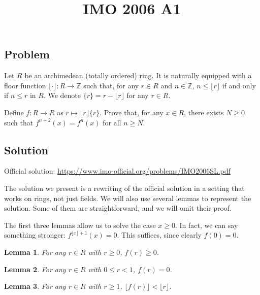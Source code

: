 \documentclass{article}
\title{IMO 2006 A1}
\author{}
\date{}
\newcommand{\Z}{\mathbb{Z}}
\newtheorem{lemma}{Lemma}
\begin{document}
\maketitle



\subsection*{Problem}

Let $R$ be an archimedean (totally ordered) ring.
It is naturally equipped with a floor function $\lfloor \cdot \rfloor : R \to \Z$ such that, for any $r \in R$ and $n \in \Z$, $n \leq \lfloor r \rfloor$ if and only if $n \leq r$ in $R$.
We denote $\{r\} = r - \lfloor r \rfloor$ for any $r \in R$.

Define $f : R \to R$ as $r \mapsto \lfloor r \rfloor \{r\}$.
Prove that, for any $x \in R$, there exists $N \geq 0$ such that $f^{n + 2}(x) = f^n(x)$ for all $n \geq N$.



\subsection*{Solution}

Official solution: \url{https://www.imo-official.org/problems/IMO2006SL.pdf}

The solution we present is a rewriting of the official solution in a setting that works on rings, not just fields.
We will also use several lemmas to represent the solution.
Some of them are straightforward, and we will omit their proof.

The first three lemmas allow us to solve the case $x \geq 0$.
In fact, we can say something stronger: $f^{\lfloor x \rfloor + 1}(x) = 0$.
This suffices, since clearly $f(0) = 0$.

\begin{lemma}\label{2006a1-1}
For any $r \in R$ with $r \geq 0$, $f(r) \geq 0$.
\end{lemma}

\begin{lemma}\label{2006a1-2}
For any $r \in R$ with $0 \leq r < 1$, $f(r) = 0$.
\end{lemma}

\begin{lemma}\label{2006a1-3}
For any $r \in R$ with $r \geq 1$, $\lfloor f(r) \rfloor < \lfloor r \rfloor$.
\end{lemma}
\end{document}
